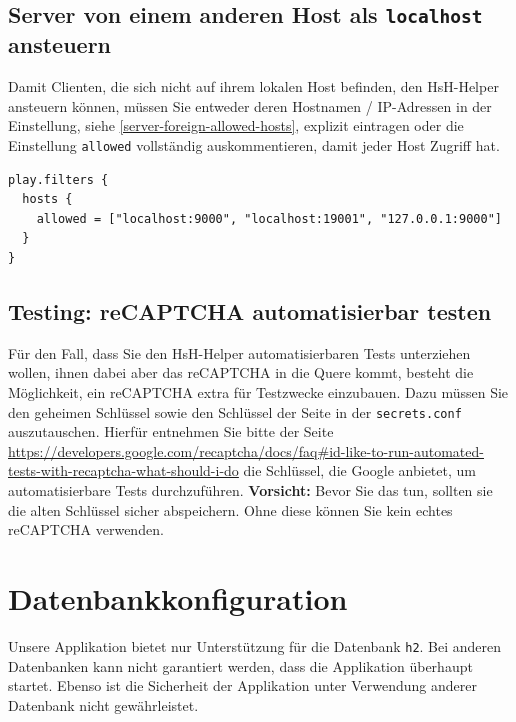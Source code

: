 \documentclass[12pt,DIV14,BCOR10mm,a4paper,parskip=half-,headsepline,headinclude,english,ngerman,bibliography=totocnumbered]{scrreprt}
\begin{document}
\subsection{Server von einem anderen Host als \texttt{localhost} ansteuern}
\label{server-subsubsection-different-host}

Damit Clienten, die sich nicht auf ihrem lokalen Host befinden, den HsH-Helper ansteuern können, müssen Sie entweder deren Hostnamen / IP-Adressen in der Einstellung, siehe \autoref{server-foreign-allowed-hosts}, explizit eintragen oder die Einstellung \texttt{allowed} vollständig auskommentieren, damit jeder Host Zugriff hat.

\begin{lstlisting}[label=server-foreign-allowed-hosts, caption={"Erlaubte Hosts"-Einstellung innerhalb der Konfigurationsdatei},captionpos=b]
play.filters {
  hosts {
    allowed = ["localhost:9000", "localhost:19001", "127.0.0.1:9000"]
  }
}
\end{lstlisting}

\subsection{Testing: reCAPTCHA automatisierbar testen}

Für den Fall, dass Sie den HsH-Helper automatisierbaren Tests unterziehen wollen, ihnen dabei aber das reCAPTCHA in die Quere kommt, besteht die Möglichkeit, ein reCAPTCHA extra für Testzwecke einzubauen.
Dazu müssen Sie den geheimen Schlüssel sowie den Schlüssel der Seite in der \texttt{secrets.conf} auszutauschen.
Hierfür entnehmen Sie bitte der Seite \url{https://developers.google.com/recaptcha/docs/faq\#id-like-to-run-automated-tests-with-recaptcha-what-should-i-do} die Schlüssel, die Google anbietet, um automatisierbare Tests durchzuführen.
\textbf{Vorsicht:} Bevor Sie das tun, sollten sie die alten Schlüssel sicher abspeichern.
Ohne diese können Sie kein echtes reCAPTCHA verwenden.

\section{Datenbankkonfiguration}

Unsere Applikation bietet nur Unterstützung für die Datenbank \texttt{h2}.
Bei anderen Datenbanken kann nicht garantiert werden, dass die Applikation überhaupt startet.
Ebenso ist die Sicherheit der Applikation unter Verwendung anderer Datenbank nicht gewährleistet.
\end{document}
